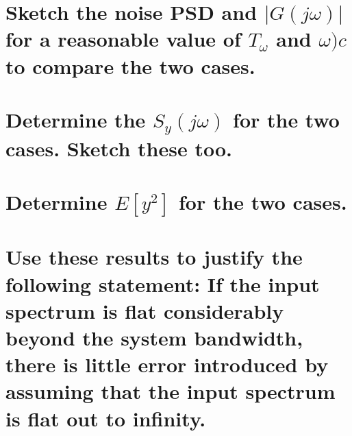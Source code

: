 \documentclass[12pt,letterpaper, onecolumn]{exam}
\begin{document}
\begin{questions}
\begin{parts}
        \part{Sketch the noise PSD and $\vert G(j\omega)\vert$ for a reasonable value of $T_\omega$ and $\omega)c$ to compare the two cases.}

        \solution{}

        \part{Determine the $S_y(j\omega)$ for the two cases. Sketch these too.}

        \solution{}

        \part{Determine $E[y^2]$ for the two cases.}

        \solution{}

        \part{Use these results to justify the following statement:
            If the input spectrum is flat considerably beyond the system bandwidth, there is little error introduced by assuming that the input spectrum is flat out to infinity.
        }

        \solution{}

    \end{parts}

\end{questions}
\end{document}
